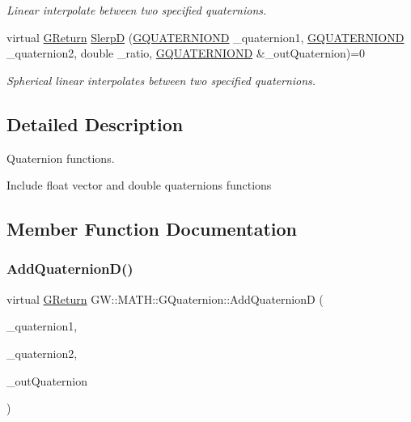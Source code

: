 \begin{DoxyCompactItemize}
\begin{DoxyCompactList}\small\item\em Linear interpolate between two specified quaternions. \end{DoxyCompactList}\item 
virtual \hyperlink{namespaceGW_a67a839e3df7ea8a5c5686613a7a3de21}{G\+Return} \hyperlink{classGW_1_1MATH_1_1GQuaternion_abbec9491d2503355f9254930cd34dd2b}{SlerpD} (\hyperlink{structGW_1_1MATH_1_1GQUATERNIOND}{G\+Q\+U\+A\+T\+E\+R\+N\+I\+O\+ND} \+\_\+quaternion1, \hyperlink{structGW_1_1MATH_1_1GQUATERNIOND}{G\+Q\+U\+A\+T\+E\+R\+N\+I\+O\+ND} \+\_\+quaternion2, double \+\_\+ratio, \hyperlink{structGW_1_1MATH_1_1GQUATERNIOND}{G\+Q\+U\+A\+T\+E\+R\+N\+I\+O\+ND} \&\+\_\+out\+Quaternion)=0
\begin{DoxyCompactList}\small\item\em Spherical linear interpolates between two specified quaternions. \end{DoxyCompactList}\end{DoxyCompactItemize}


\subsection{Detailed Description}
Quaternion functions. 

Include float vector and double quaternion\textquotesingle{}s functions 

\subsection{Member Function Documentation}
\mbox{\label{classGW_1_1MATH_1_1GQuaternion_a7b2b661a82bd6370567ab2a31c463cea}} 
\subsubsection{\texorpdfstring{Add\+Quaternion\+D()}{AddQuaternionD()}}
{\footnotesize\ttfamily virtual \hyperlink{namespaceGW_a67a839e3df7ea8a5c5686613a7a3de21}{G\+Return} G\+W\+::\+M\+A\+T\+H\+::\+G\+Quaternion\+::\+Add\+QuaternionD (\begin{DoxyParamCaption}\item[{\hyperlink{structGW_1_1MATH_1_1GQUATERNIOND}{G\+Q\+U\+A\+T\+E\+R\+N\+I\+O\+ND}}]{\+\_\+quaternion1,  }\item[{\hyperlink{structGW_1_1MATH_1_1GQUATERNIOND}{G\+Q\+U\+A\+T\+E\+R\+N\+I\+O\+ND}}]{\+\_\+quaternion2,  }\item[{\hyperlink{structGW_1_1MATH_1_1GQUATERNIOND}{G\+Q\+U\+A\+T\+E\+R\+N\+I\+O\+ND} \&}]{\+\_\+out\+Quaternion }\end{DoxyParamCaption})\hspace{0.3cm}{\ttfamily [pure virtual]}}



